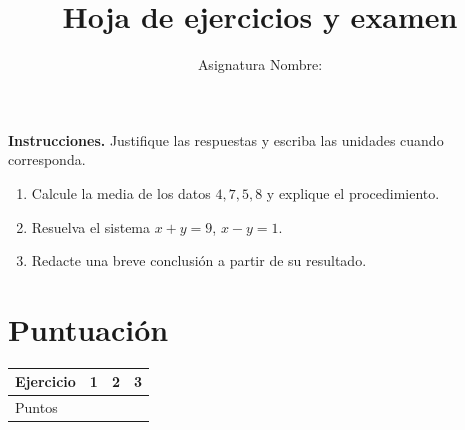 \documentclass[11pt]{article}
\title{Hoja de ejercicios y examen}
\author{Asignatura \hfill Nombre: \rule{5cm}{0.4pt}}
\date{Fecha: \rule{4cm}{0.4pt}}
\begin{document}
\maketitle
\noindent\textbf{Instrucciones.} Justifique las respuestas y escriba las unidades cuando corresponda.
\begin{enumerate}[leftmargin=*]
\item Calcule la media de los datos $4, 7, 5, 8$ y explique el procedimiento.\par\vspace{1.8cm}\hrulefill
\item Resuelva el sistema $x+y=9$, $x-y=1$.\par\vspace{2.0cm}\hrulefill
\item Redacte una breve conclusión a partir de su resultado.\par\vspace{1.7cm}\hrulefill
\end{enumerate}
\section*{Puntuación}\begin{tabular}{lccc}\hline Ejercicio & 1 & 2 & 3\\\hline Puntos & & & \\\hline\end{tabular}
\end{document}
